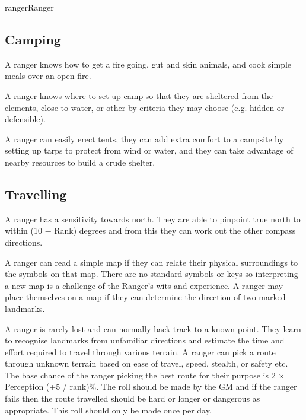 \begin{Skill}[2.1]{ranger}{Ranger}
\begin{Description}
\end{Description}

\subsection{Camping}

\begin{Description}

\item[Preparing Food] A ranger knows how to get a fire going, gut and
  skin animals, and cook simple meals over an open fire.

\item[Campsites] A ranger knows where to set up camp so that they are
  sheltered from the elements, close to water, or other by criteria
  they may choose (e.g. hidden or defensible).

  A ranger can easily erect tents, they can add extra comfort to a
  campsite by setting up tarps to protect from wind or water, and they
  can take advantage of nearby resources to build a crude shelter.

\end{Description}

\subsection{Travelling}

\begin{Description}

\item[Orientation] A ranger has a sensitivity towards north. They are
  able to pinpoint true north to within (10 − Rank) degrees and from
  this they can work out the other compass directions.

\item[Map Reading] A ranger can read a simple map if they can relate
  their physical surroundings to the symbols on that map.  There are
  no standard symbols or keys so interpreting a new map is a challenge
  of the Ranger’s wits and experience.  A ranger may place themselves
  on a map if they can determine the direction of two marked
  landmarks.

\item[Route Finding] A ranger is rarely lost and can normally back
  track to a known point.  They learn to recognise landmarks from
  unfamiliar directions and estimate the time and effort required to
  travel through various terrain.  A ranger can pick a route through
  unknown terrain based on ease of travel, speed, stealth, or safety
  etc. The base chance of the ranger picking the best route for their
  purpose is 2 × Perception (+5 / rank)\%.  The roll should be made by
  the GM and if the ranger fails then the route travelled should be
  hard or longer or dangerous as appropriate.  This roll should only
  be made once per day.


\end{Description}
\end{Skill}
